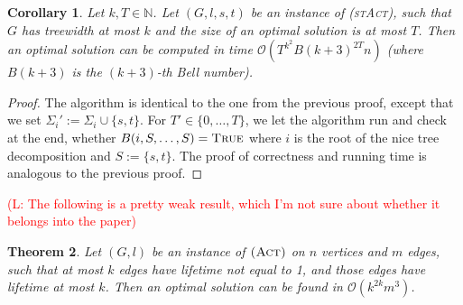 \documentclass[10pt,a4paper]{article}
\newtheorem{theorem}{Theorem}[section]
\newtheorem{corollary}[theorem]{Corollary}
\numberwithin{equation}{section}
\newcommand{\N}{\mathbb{N}}
\newcommand{\set}[1]{\{ #1 \}}
\newcommand{\fromto}[2]{\set{#1, \ldots, #2}}
\newcommand{\comment}[1]{\textcolor{red}{(L: #1)}}
\newcommand{\bigO}{\mathcal{O}}
\newcommand{\act}{\textsc{(Act)}}
\newcommand{\stact}{\textsc{(stAct)}}
\newcommand{\True}{\textsc{True}}
\begin{document}
\begin{corollary}
Let $k, T \in \N$. Let $(G, l, s, t)$ be an instance of \stact, such that $G$ has treewidth at most $k$ and the size of an optimal solution is at most $T$. Then an optimal solution can be computed in time $\bigO(T^{k^2}B(k+3)^{2T}n)$ (where $B(k+3)$ is the $(k+3)$-th Bell number).
\end{corollary}
\begin{proof}
The algorithm is identical to the one from the previous proof, except that we set $\Sigma_i' := \Sigma_i \cup \set{s, t}$. For $T' \in \fromto{0}{T}$, we let the algorithm run and check at the end, whether $B(i, S,\dots, S) = \True$ where $i$ is the root of the nice tree decomposition and $S := \set{s, t}$. The proof of correctness  and running time is analogous to the previous proof.
\end{proof}

\comment{The following is a pretty weak result, which I'm not sure about whether it belongs into the paper}

\begin{theorem}
Let $(G, l)$ be an instance of $\act$ on $n$ vertices and $m$ edges, such that at most $k$ edges have lifetime not equal to 1, and those edges have lifetime at most $k$. Then an optimal solution can be found in $\bigO(k^{2k}m^3)$.
\end{theorem}
\end{document}
